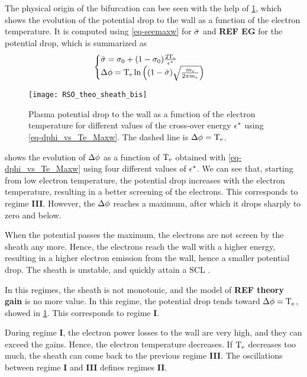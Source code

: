    
   The physical origin of the bifurcation can bee seen with the help of \cref{fig-dphivsTe}, which shows the evolution of the potential drop to the wall as a function of the electron temperature.
   It is computed using \cref{eq-seemaxw} for $ \bar{\sigma } $ and {\bf REF EG} for the potential drop, which is summarized as 
   \begin{equation} \label{eq-dphi_vs_Te_Maxw}
     \begin{cases}
        \bar{\sigma }  = \sigma _0 + (1- \sigma _0) \frac{2 \mathrm{T_e}}{\epsilon^{*}} \\
       \Delta \phi = \mathrm{T_e} \ln \left( (1 -  \bar{\sigma } ) \sqrt{ \frac{m_i}{2 \pi m_e}}  \right)
     \end{cases}
   \end{equation}
   
   \begin{figure}[hbtp]
     \centering
     \texttt{[image: RSO\_theo\_sheath\_bis]}
     \caption{Plasma potential drop to the wall as a function of the electron temperature for different values of the cross-over energy $\epsilon^{*}$ using \cref{eq-dphi_vs_Te_Maxw}. The dashed line is $\Delta \phi=\mathrm{T_e}$. }
     \label{fig-dphivsTe}
   \end{figure}
   
    shows the evolution of $\Delta \phi$ as a function of $\mathrm{T_e}$ obtained with \cref{eq-dphi_vs_Te_Maxw} using four different values of $\epsilon^{*}$. 
   We can see that, starting from low electron temperature, the potential drop increases with the electron temperature, resulting in a better screening of the electrons.
   This corresponds to regime {\bf III}.
   However, the $\Delta \phi$ reaches a maximum, after which it drops sharply to zero and below.
   
   When the potential passes the maximum, the electrons are not screen by the sheath any more.
   Hence, the electrons reach the wall with a higher energy, resulting in a higher electron emission from the wall, hence a smaller potential drop.
   The sheath is unstable, and quickly attain a \ac{SCL} \citep{raitses2005}.
   
   In this regimes, the sheath is not monotonic, and the model of {\bf REF theory gain} is no more value.
   In this regime, the potential drop tends toward $\Delta \phi = \mathrm{T_e}$, showed in \cref{fig-dphivsTe}.
   This corresponds to regime {\bf I}.
   
   During regime {\bf I}, the electron power losses to the wall are very high, and they can exceed the gains.
   Hence, the electron temperature decreases.
   If $\mathrm{T_e}$ decreases too much, the sheath can come back to the previous regime {\bf III}.
   The oscillations between regime {\bf I} and {\bf III} defines regimes {\bf II}.
   
